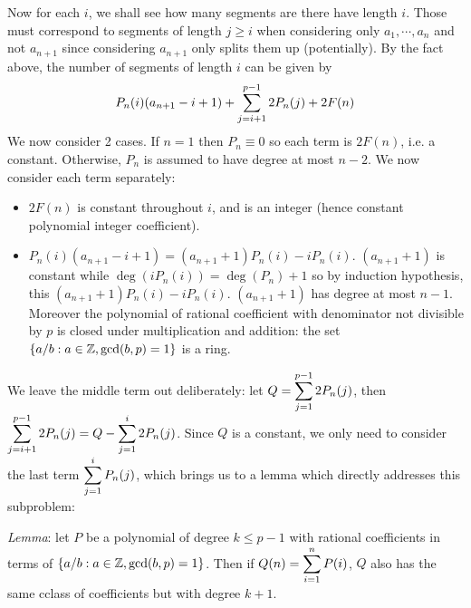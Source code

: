 \documentclass[11pt,a4paper]{article}
\begin{document}
\begin{enumerate}
	Now for each $i$, we shall see how many segments are there have length $i$. Those must correspond to segments of length $j\ge i$ when considering only $a_1, \cdots, a_n$ and not $a_{n+1}$ since considering $a_{n+1}$ only splits them up (potentially). 
	By the fact above, the number of segments of length $i$ can be given by 
	\[P_n(i)(a_{n+1}-i+1) + \displaystyle\sum_{j=i+1}^{p-1}2P_n(j) + 2F(n)
	\]
	We now consider 2 cases. If $n=1$ then $P_n\equiv 0$ so each term is $2F(n)$, i.e. a constant. 
	Otherwise, $P_n$ is assumed to have degree at most $n-2$. We now consider each term separately: 
	\begin{itemize}
		\item $2F(n)$ is constant throughout $i$, and is an integer (hence constant polynomial integer coefficient). 
		\item $P_n(i)(a_{n+1}-i+1) = (a_{n+1}+1)P_n(i) - iP_n(i)$. $(a_{n+1}+1)$ is constant while $\deg(iP_n(i)) = \deg(P_n)+1$ so by induction hypothesis, this $(a_{n+1}+1)P_n(i) - iP_n(i)$. $(a_{n+1}+1)$ has degree at most $n-1$. Moreover the polynomial of rational coefficient with denominator not divisible by $p$ is closed under multiplication and addition: the set $\{a/b: a\in\mathbb{Z}, \gcd(b, p)=1\}$ is a ring. 
	\end{itemize}
	We leave the middle term out deliberately: let $Q=\displaystyle\sum_{j=1}^{p-1}2P_n(j)$, then $\displaystyle\sum_{j=i+1}^{p-1}2P_n(j) = Q - \displaystyle\sum_{j=1}^{i}2P_n(j)$. 
	Since $Q$ is a constant, we only need to consider the last term $\displaystyle\sum_{j=1}^{i}P_n(j)$, which brings us to a lemma which directly addresses this subproblem: 
	
	\emph{Lemma}: let $P$ be a polynomial of degree $k\le p - 1$ with rational coefficients in terms of $\{a/b: a\in\mathbb{Z}, \gcd(b, p)=1\}$. Then if $Q(n)=\displaystyle\sum_{i=1}^n P(i)$, $Q$ also has the same cclass of coefficients but with degree $k+1$. 
	

\end{enumerate}
\end{document}
